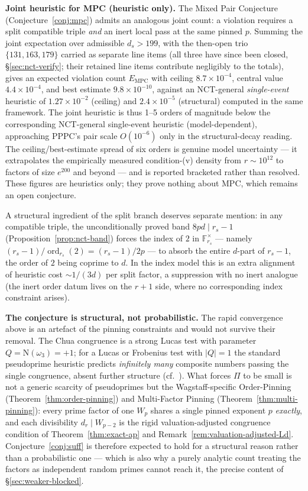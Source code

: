\documentclass[11pt]{amsart}
\theoremstyle{plain}
\theoremstyle{definition}
\theoremstyle{remark}
\numberwithin{equation}{section}
\newcommand{\ord}{\operatorname{ord}}
\newcommand{\F}{\mathbb{F}}
\begin{document}
\textbf{Joint heuristic for MPC (heuristic only).} The Mixed Pair Conjecture (Conjecture~\ref{conj:mpc}) admits an analogous joint count: a violation requires a split compatible triple \emph{and} an inert local pass at the same pinned $p$. Summing the joint expectation over admissible $d_s > 199$, with the then-open trio $\{131, 163, 179\}$ carried as separate line items (all three have since been closed, \S\ref{sec:nct-verify}; their retained line items contribute negligibly to the totals), gives an expected violation count $E_{\mathrm{MPC}}$ with ceiling $8.7 \times 10^{-4}$, central value $4.4 \times 10^{-4}$, and best estimate $9.8 \times 10^{-10}$, against an NCT-general \emph{single-event} heuristic of $1.27 \times 10^{-2}$ (ceiling) and $2.4 \times 10^{-5}$ (structural) computed in the same framework. The joint heuristic is thus 1--5 orders of magnitude below the corresponding NCT-general single-event heuristic (model-dependent), approaching PPPC's pair scale $O(10^{-6})$ only in the structural-decay reading. The ceiling/best-estimate spread of six orders is genuine model uncertainty --- it extrapolates the empirically measured condition-(v) density from $r \sim 10^{12}$ to factors of size $e^{200}$ and beyond --- and is reported bracketed rather than resolved. These figures are heuristics only; they prove nothing about MPC, which remains an open conjecture.

A structural ingredient of the split branch deserves separate mention: in any compatible triple, the unconditionally proved band $8 p d \mid r_s - 1$ (Proposition~\ref{prop:nct-band}) forces the index of $2$ in $\F_{r_s}^\times$ --- namely $(r_s - 1)/\ord_{r_s}(2) = (r_s - 1)/2p$ --- to absorb the entire $d$-part of $r_s - 1$, the order of $2$ being coprime to $d$. In the index model this is an extra alignment of heuristic cost $\sim 1/(3d)$ per split factor, a suppression with no inert analogue (the inert order datum lives on the $r + 1$ side, where no corresponding index constraint arises).

\textbf{The conjecture is structural, not probabilistic.} The rapid convergence above is an artefact of the pinning constraints and would not survive their removal. The Chua congruence is a strong Lucas test with parameter $Q = \mathrm{N}(\omega_3) = +1$; for a Lucas or Frobenius test with $|Q| = 1$ the standard pseudoprime heuristic predicts \emph{infinitely many} composite numbers passing the single congruence, absent further structure (cf.\ \cite{ref:Grantham}). What forces $\Pi$ to be small is not a generic scarcity of pseudoprimes but the Wagstaff-specific Order-Pinning (Theorem~\ref{thm:order-pinning}) and Multi-Factor Pinning (Theorem~\ref{thm:multi-pinning}): every prime factor of one $W_p$ shares a single pinned exponent $p$ \emph{exactly}, and each divisibility $d_r \mid W_{p-2}$ is the rigid valuation-adjusted congruence condition of Theorem~\ref{thm:exact-ap} and Remark~\ref{rem:valuation-adjusted-Ld}. Conjecture~\ref{conj:suff} is therefore expected to hold for a structural reason rather than a probabilistic one --- which is also why a purely analytic count treating the factors as independent random primes cannot reach it, the precise content of \S\ref{sec:weaker-blocked}.
\end{document}
